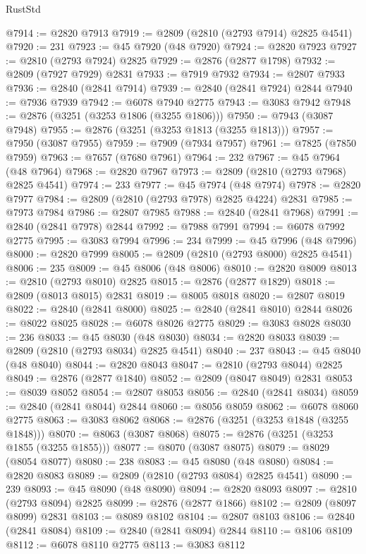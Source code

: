 \begin{lexlean}{RustStd}
\begin{coremodule}
@7914 := @2820 @7913
@7919 := @2809 (@2810 (@2793 @7914) @2825 @4541)
@7920 := 231
@7923 := @45 @7920 (@48 @7920)
@7924 := @2820 @7923
@7927 := @2810 (@2793 @7924) @2825
@7929 := @2876 (@2877 @1798)
@7932 := @2809 (@7927 @7929) @2831
@7933 := @7919 @7932
@7934 := @2807 @7933
@7936 := @2840 (@2841 @7914)
@7939 := @2840 (@2841 @7924) @2844
@7940 := @7936 @7939
@7942 := @6078 @7940 @2775
@7943 := @3083 @7942
@7948 := @2876 (@3251 (@3253 @1806 (@3255 @1806)))
@7950 := @7943 (@3087 @7948)
@7955 := @2876 (@3251 (@3253 @1813 (@3255 @1813)))
@7957 := @7950 (@3087 @7955)
@7959 := @7909 (@7934 @7957)
@7961 := @7825 (@7850 @7959)
@7963 := @7657 (@7680 @7961)
@7964 := 232
@7967 := @45 @7964 (@48 @7964)
@7968 := @2820 @7967
@7973 := @2809 (@2810 (@2793 @7968) @2825 @4541)
@7974 := 233
@7977 := @45 @7974 (@48 @7974)
@7978 := @2820 @7977
@7984 := @2809 (@2810 (@2793 @7978) @2825 @4224) @2831
@7985 := @7973 @7984
@7986 := @2807 @7985
@7988 := @2840 (@2841 @7968)
@7991 := @2840 (@2841 @7978) @2844
@7992 := @7988 @7991
@7994 := @6078 @7992 @2775
@7995 := @3083 @7994
@7996 := 234
@7999 := @45 @7996 (@48 @7996)
@8000 := @2820 @7999
@8005 := @2809 (@2810 (@2793 @8000) @2825 @4541)
@8006 := 235
@8009 := @45 @8006 (@48 @8006)
@8010 := @2820 @8009
@8013 := @2810 (@2793 @8010) @2825
@8015 := @2876 (@2877 @1829)
@8018 := @2809 (@8013 @8015) @2831
@8019 := @8005 @8018
@8020 := @2807 @8019
@8022 := @2840 (@2841 @8000)
@8025 := @2840 (@2841 @8010) @2844
@8026 := @8022 @8025
@8028 := @6078 @8026 @2775
@8029 := @3083 @8028
@8030 := 236
@8033 := @45 @8030 (@48 @8030)
@8034 := @2820 @8033
@8039 := @2809 (@2810 (@2793 @8034) @2825 @4541)
@8040 := 237
@8043 := @45 @8040 (@48 @8040)
@8044 := @2820 @8043
@8047 := @2810 (@2793 @8044) @2825
@8049 := @2876 (@2877 @1840)
@8052 := @2809 (@8047 @8049) @2831
@8053 := @8039 @8052
@8054 := @2807 @8053
@8056 := @2840 (@2841 @8034)
@8059 := @2840 (@2841 @8044) @2844
@8060 := @8056 @8059
@8062 := @6078 @8060 @2775
@8063 := @3083 @8062
@8068 := @2876 (@3251 (@3253 @1848 (@3255 @1848)))
@8070 := @8063 (@3087 @8068)
@8075 := @2876 (@3251 (@3253 @1855 (@3255 @1855)))
@8077 := @8070 (@3087 @8075)
@8079 := @8029 (@8054 @8077)
@8080 := 238
@8083 := @45 @8080 (@48 @8080)
@8084 := @2820 @8083
@8089 := @2809 (@2810 (@2793 @8084) @2825 @4541)
@8090 := 239
@8093 := @45 @8090 (@48 @8090)
@8094 := @2820 @8093
@8097 := @2810 (@2793 @8094) @2825
@8099 := @2876 (@2877 @1866)
@8102 := @2809 (@8097 @8099) @2831
@8103 := @8089 @8102
@8104 := @2807 @8103
@8106 := @2840 (@2841 @8084)
@8109 := @2840 (@2841 @8094) @2844
@8110 := @8106 @8109
@8112 := @6078 @8110 @2775
@8113 := @3083 @8112

\end{coremodule}
\end{lexlean}
